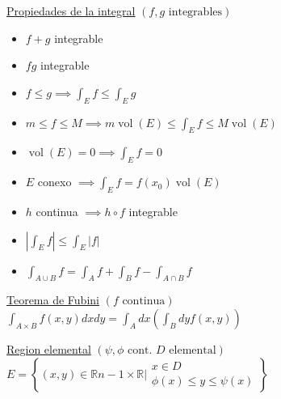 \documentclass[12pt]{article}
\newcommand{\real}{\mathbb{R}}
\newcommand\setb[1]{\left\{#1\right\}}
\newcommand{\abs}[1]{\left\vert #1 \right\vert}
\DeclareMathOperator{\vol}{vol}
\begin{document}
\begin{multicols}{3}
\underline{Propiedades de la integral} $\left( f,g \text{ integrables} \right)$
\begin{itemize}
	\itemsep0em
	\item $f+g$ integrable
	\item $fg$ integrable
	\item $f \leq g \implies \int_E f \leq \int_E g$ 
	\item $m \leq f \leq M \implies m\vol(E) \leq \int_E f \leq M\vol(E)$
	\item $\vol(E)=0 \implies \int_E f = 0$
	\item $E$ conexo $\implies \int_E f = f(x_0)\vol(E)$
	\item $h$ continua $\implies h \circ f$ integrable
	\item $\abs{\int_E f} \leq \int_E \abs{f}$
	\item $\int_{A \cup B} f = \int_A f + \int_B f - \int_{A \cap B} f$
\end{itemize}

\underline{Teorema de Fubini} $\left( f \text{ continua} \right)$
$\int_{A\times B} f(x,y) dx dy = \int_A dx \left( \int_B dy f(x,y) \right)$

\underline{Region elemental} $\left( \psi, \phi \text{ cont. } D \text{ elemental} \right)$
$E = \setb{(x,y) \in \real{n-1} \times \real \vert \substack{x \in D \\
		\phi(x) \leq y \leq \psi(x)}}$
\end{multicols}
\end{document}
